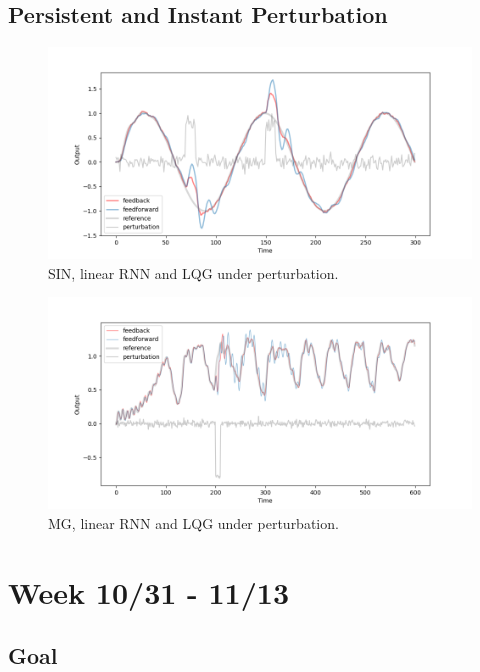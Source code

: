 \documentclass[12pt, a4paper]{article}
\begin{document}
\subsection*{Persistent and Instant Perturbation}

\begin{figure}[H]
    \centering
    \includegraphics[width=\textwidth]{baseline_linear/fig/SIN_lin_noise.png}
    \caption{SIN, linear RNN and LQG under perturbation.}
\end{figure}

\begin{figure}[H]
    \centering
    \includegraphics[width=\textwidth]{baseline_linear/fig/MG_lin_noise.png}
    \caption{MG, linear RNN and LQG under perturbation.}
\end{figure}


\newpage


\section*{Week 10/31 - 11/13}

\subsection*{Goal}
\end{document}
